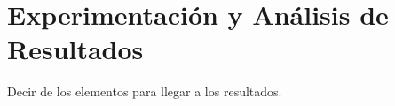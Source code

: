 \documentclass[class=report, crop=false]{standalone}
\begin{document}
\chapter{Experimentación y Análisis de Resultados}

Decir de los elementos para llegar a los \cite{b7} resultados.

\end{document}
